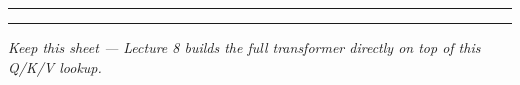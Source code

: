 \documentclass[11pt]{article}
\newif\ifsolution
\newcommand{\keybox}[1]{\ifsolution\par\vspace{2pt}%
  \fbox{\parbox{0.965\textwidth}{\small\textbf{Answer.}\; #1}}\par\fi}
\begin{document}
\keybox{(a) $s_1 = (1)(-1)+(1)(1) = \mathbf{0}$, \ $s_2 = (1)(1)+(1)(1) = \mathbf{2}$, \
$s_3 = (1)(1)+(1)(0) = \mathbf{1}$. \ (b) $\sum_j e^{s_j} = 1.00 + 7.39 + 2.72 = 11.11$, so
$w_1 = 1.00/11.11 = \mathbf{0.09}$, \ $w_2 = 7.39/11.11 = \mathbf{0.67}$, \ $w_3 = 2.72/11.11 =
\mathbf{0.24}$ (sum $1.00$). \ (c) $\text{output} = (0.09)(4) + (0.67)(9) + (0.24)(1) = 0.36 + 6.03 +
0.24 = \mathbf{6.63}$. The output is pulled toward token 2's value ($9$) because token 2 scored
highest, so softmax gave it the most weight ($0.67$) --- that is all ``paying attention'' means:
score by query$\cdot$key, soften into weights, blend the values.}

\vspace{2pt}\hrule\vspace{5pt}

\vspace{2pt}\hrule\vspace{3pt}
{\small\itshape \ifsolution Answer key.\else Keep this sheet --- Lecture 8 builds the full
transformer directly on top of this Q/K/V lookup.\fi}
\end{document}
